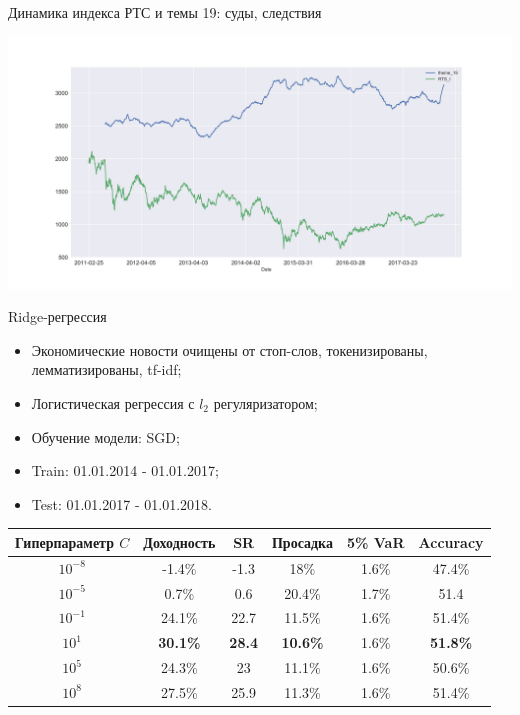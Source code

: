 \documentclass[c, dvipsnames]{beamer}  %
\begin{document}
\begin{frame}{Динамика индекса РТС и темы 19: суды, следствия }
 \begin{center}
	\includegraphics[scale=0.32]{dinamtheme_19.png}
\end{center}
\end{frame}



\begin{frame}{Ridge-регрессия}

\begin{itemize}
	\item   Экономические новости очищены от стоп-слов, токенизированы, лемматизированы, tf-idf;
	\item   Логистическая регрессия с $l_2$ регуляризатором;
	\item   Обучение модели:  SGD;
	\item  Train: 01.01.2014 - 01.01.2017;
	\item  Test:   01.01.2017 - 01.01.2018.
\end{itemize}


\begin{center}
{\scriptsize
\begin{tabular}{cccccc}
	\toprule
	Гиперпараметр $C$ &  Доходность  &  SR  & Просадка & 5\%  VaR  & Accuracy  \\
	\midrule
	$10^{-8}$	 &   -1.4\%  &  -1.3   &  18\% & 1.6\%  & 47.4\%   \\
	$10^{-5}	$ &   0.7\% &  0.6   &  20.4\%   &   1.7\%  &  51.4  \\
	$10^{-1}$	 &  24.1\%   &   22.7   & 11.5\%  &    1.6\%   & 51.4\%    \\
	$10^{1}$	 & \textbf{30.1\%}    &    \textbf{28.4}   &  \textbf{10.6\%}  &  1.6\%  &  \textbf{51.8\%}   \\
	$10^{5}$	 &  24.3\%  &   23  & 11.1\%  &  1.6\%  & 50.6\%    \\
	$10^{8}$	 &  27.5\% & 25.9    &  11.3\% &  1.6\%  &  51.4\%    \\
	\bottomrule
\end{tabular}
}
\end{center}
\end{frame}
\end{document}
